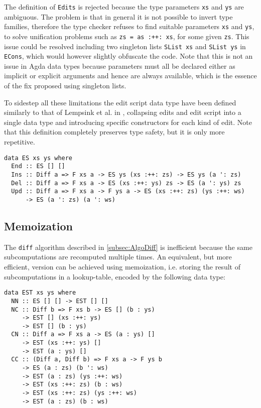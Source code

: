 \documentclass[../Thesis.tex]{subfiles}
\begin{document}
	The definition of \texttt{Edits} is rejected because the type parameters
	\texttt{xs} and \texttt{ys} are ambiguous. The problem is that 
	in general it is not possible to invert type families, therefore
	the type checker refuses to find suitable parameters \texttt{xs} and 
	\texttt{ys}, to solve unification problems such as \texttt{zs = as :++: xs},
	for some given \texttt{zs}. This issue could be resolved including
	two singleton lists \texttt{SList xs} and \texttt{SList ys} in \texttt{ECons},
	which would however slightly obfuscate the code.
	Note that this is not an issue in Agda data types because parameters
	must all be declared either as implicit or explicit arguments and 
	hence are always available, which is the essence of the fix proposed
	using singleton lists.	
	
	To sidestep all these limitations the edit script data type have been defined 
	similarly to that of Lempsink et al. in \cite{Lemp09}, 
	collapsing edits and edit script into
	a single data type and introducing specific constructors for
	each kind of edit. Note that this definition completely preserves type safety,
	but it is only more repetitive.

\begin{verbatim}
data ES xs ys where
  End :: ES [] []
  Ins :: Diff a => F xs a -> ES ys (xs :++: zs) -> ES ys (a ': zs)
  Del :: Diff a => F xs a -> ES (xs :++: ys) zs -> ES (a ': ys) zs
  Upd :: Diff a => F xs a -> F ys a -> ES (xs :++: zs) (ys :++: ws) 
      -> ES (a ': zs) (a ': ws)
\end{verbatim}

	\subsection{Memoization}
	The \texttt{diff} algorithm described in \ref{subsec:AlgoDiff} is inefficient 
	because the same subcomputations are recomputed multiple times.
	An equivalent, but more efficient, version can be achieved using 
	memoization, i.e. storing the result of subcomputations in a lookup-table,
	encoded by the following data type:
	
\begin{verbatim}	
data EST xs ys where
  NN :: ES [] [] -> EST [] []
  NC :: Diff b => F xs b -> ES [] (b : ys) 
     -> EST [] (xs :++: ys) 
     -> EST [] (b : ys)
  CN :: Diff a => F xs a -> ES (a : ys) [] 
     -> EST (xs :++: ys) []
     -> EST (a : ys) []
  CC :: (Diff a, Diff b) => F xs a -> F ys b 
     -> ES (a : zs) (b ': ws) 
     -> EST (a : zs) (ys :++: ws)
     -> EST (xs :++: zs) (b : ws)
     -> EST (xs :++: zs) (ys :++: ws)
     -> EST (a : zs) (b : ws)
\end{verbatim}
	
\end{document}
